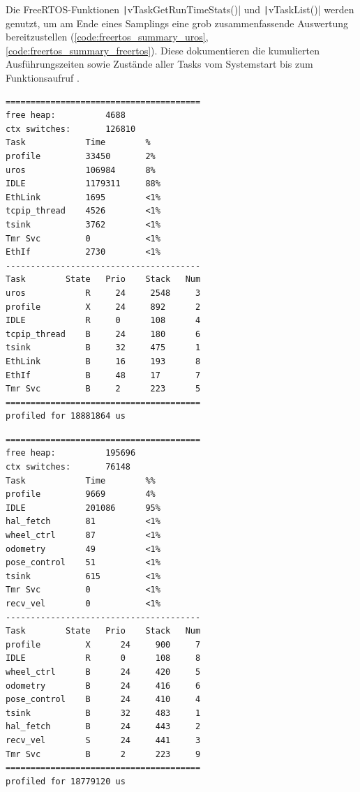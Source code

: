 Die FreeRTOS-Funktionen \texttt|vTaskGetRunTimeStats()| und
\texttt|vTaskList()| werden genutzt, um am Ende eines Samplings eine
grob zusammenfassende Auswertung bereitzustellen
(\ref{code:freertos_summary_uros}, \ref{code:freertos_summary_freertos}). Diese
dokumentieren die kumulierten Ausführungszeiten sowie Zustände aller Tasks vom
Systemstart bis zum Funktionsaufruf \cite{freertos_runtime_stats}.

\begin{minipage}[t]{0.5\textwidth}
\begin{code}
    \begin{verbatim}
=======================================
free heap:          4688
ctx switches:       126810
Task            Time        %
profile         33450       2%
uros            106984      8%
IDLE            1179311     88%
EthLink         1695        <1%
tcpip_thread    4526        <1%
tsink           3762        <1%
Tmr Svc         0           <1%
EthIf           2730        <1%
---------------------------------------
Task        State   Prio    Stack   Num
uros            R     24     2548     3
profile         X     24     892      2
IDLE            R     0      108      4
tcpip_thread    B     24     180      6
tsink           B     32     475      1
EthLink         B     16     193      8
EthIf           B     48     17       7
Tmr Svc         B     2      223      5
=======================================
profiled for 18881864 us
\end{verbatim}
    \label{code:freertos_summary_uros}
\end{code}
\end{minipage}
\hfill
\begin{minipage}[t]{0.5\textwidth}
\begin{code}
\begin{verbatim}
=======================================
free heap:          195696
ctx switches:       76148
Task            Time        %%
profile         9669        4%
IDLE            201086      95%
hal_fetch       81          <1%
wheel_ctrl      87          <1%
odometry        49          <1%
pose_control    51          <1%
tsink           615         <1%
Tmr Svc         0           <1%
recv_vel        0           <1%
---------------------------------------
Task        State   Prio    Stack   Num
profile         X      24     900     7
IDLE            R      0      108     8
wheel_ctrl      B      24     420     5
odometry        B      24     416     6
pose_control    B      24     410     4
tsink           B      32     483     1
hal_fetch       B      24     443     2
recv_vel        S      24     441     3
Tmr Svc         B      2      223     9
=======================================
profiled for 18779120 us
\end{verbatim}
    \label{code:freertos_summary_freertos}
\end{code}
\end{minipage}


